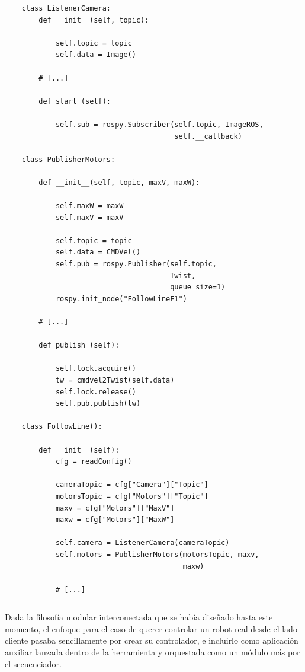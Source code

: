 \begin{verbatim}
    class ListenerCamera:
        def __init__(self, topic):
            
            self.topic = topic
            self.data = Image()
    
        # [...]
    
        def start (self):
     
            self.sub = rospy.Subscriber(self.topic, ImageROS,
                                        self.__callback)
    
    class PublisherMotors:
     
        def __init__(self, topic, maxV, maxW):
    
            self.maxW = maxW
            self.maxV = maxV
    
            self.topic = topic
            self.data = CMDVel()
            self.pub = rospy.Publisher(self.topic,
                                       Twist,
                                       queue_size=1)
            rospy.init_node("FollowLineF1")
    
        # [...]
    
        def publish (self):
    
            self.lock.acquire()
            tw = cmdvel2Twist(self.data)
            self.lock.release()
            self.pub.publish(tw)
    
    class FollowLine():
        
        def __init__(self):
            cfg = readConfig()
    
            cameraTopic = cfg["Camera"]["Topic"]
            motorsTopic = cfg["Motors"]["Topic"]
            maxv = cfg["Motors"]["MaxV"]
            maxw = cfg["Motors"]["MaxW"]
    
            self.camera = ListenerCamera(cameraTopic)
            self.motors = PublisherMotors(motorsTopic, maxv,
                                          maxw)
    
            # [...]
\end{verbatim}
\begin{lstlisting}[caption=Creación de la Red Interna de Comunicación]
\end{lstlisting}

Dada la filosofía modular interconectada que se había diseñado hasta este momento, el enfoque para el caso de querer controlar un robot real desde el lado cliente pasaba sencillamente por crear su controlador, e incluirlo como aplicación auxiliar lanzada dentro de la herramienta y orquestada como un módulo más por el secuenciador.

